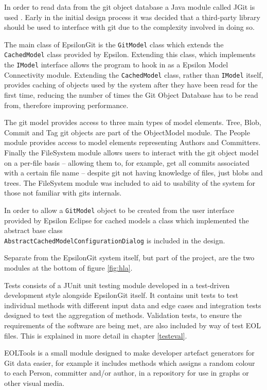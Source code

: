 \documentclass[11pt]{book}
\newcommand{\code}[1]{\texttt{#1}}
\begin{document}
In order to read data from the git object database a Java module called JGit is used \cite{jgit}. Early in the initial design process it was decided that a third-party library should be used to interface with git due to the complexity involved in doing so. 

The main class of EpsilonGit is the \code{GitModel} class which extends the \code{CachedModel} class provided by Epsilon. Extending this class, which implements the \code{IModel} interface allows the program to hook in as a Epsilon Model Connectivity module. Extending the \code{CachedModel} class, rather than \code{IModel} itself, provides caching of objects used by the system after they have been read for the first time, reducing the number of times the Git Object Database has to be read from, therefore improving performance.

The git model provides access to three main types of model elements. Tree, Blob, Commit and Tag git objects are part of the ObjectModel module. The People module provides access to model elements representing Authors and Committers. Finally the FileSystem module allows users to interact with the git object model on a per-file basis -- allowing them to, for example, get all commits associated with a certain file name -- despite git not having knowledge of files, just blobs and trees. The FileSystem module was included to aid to usability of the system for those not familiar with gits internals.

In order to allow a \code{GitModel} object to be created from the user interface provided by Epsilon Eclipse for cached models a class which implemented the abstract base class \\ \code{AbstractCachedModelConfigurationDialog} is included in the design.

Separate from the EpsilonGit system itself, but part of the project, are the two modules at the bottom of figure \ref{fig:hla}. 

Tests consists of a JUnit \cite{junit} unit testing module developed in a test-driven development style alongside EpsilonGit itself. It contains unit tests to test individual methods with different input data and edge cases and integration tests designed to test the aggregation of methods. Validation tests, to ensure the requirements of the software are being met, are also included by way of test EOL files. This is explained in more detail in chapter \ref{testeval}.

EOLTools is a small module designed to make 	developer artefact generators for Git data easier, for example it includes methods which assigns a random colour to each Person, committer and/or author, in a repository for use in graphs or other visual media.
\end{document}
